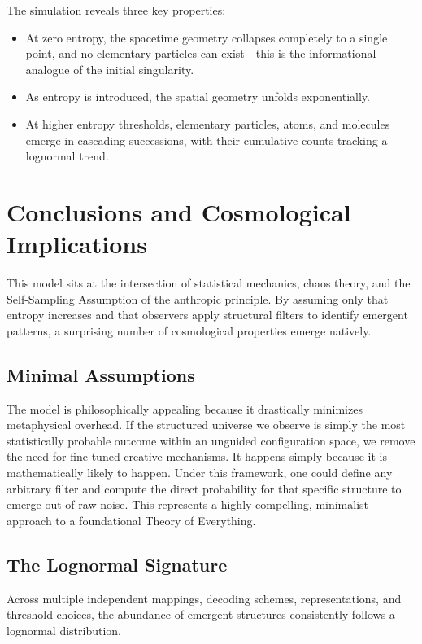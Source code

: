 The simulation reveals three key properties:
\begin{itemize}
    \item At zero entropy, the spacetime geometry collapses completely to a single point, and no elementary particles can exist—this is the informational analogue of the initial singularity.
    \item As entropy is introduced, the spatial geometry unfolds exponentially.
    \item At higher entropy thresholds, elementary particles, atoms, and molecules emerge in cascading successions, with their cumulative counts tracking a lognormal trend.
\end{itemize}

\section{Conclusions and Cosmological Implications}

This model sits at the intersection of statistical mechanics, chaos theory, and the Self-Sampling Assumption of the anthropic principle. By assuming only that entropy increases and that observers apply structural filters to identify emergent patterns, a surprising number of cosmological properties emerge natively.

\subsection*{Minimal Assumptions}

The model is philosophically appealing because it drastically minimizes metaphysical overhead. If the structured universe we observe is simply the most statistically probable outcome within an unguided configuration space, we remove the need for fine-tuned creative mechanisms. It happens simply because it is mathematically likely to happen. Under this framework, one could define any arbitrary filter and compute the direct probability for that specific structure to emerge out of raw noise. This represents a highly compelling, minimalist approach to a foundational Theory of Everything.

\subsection*{The Lognormal Signature}

Across multiple independent mappings, decoding schemes, representations, and threshold choices, the abundance of emergent structures consistently follows a lognormal distribution. 

